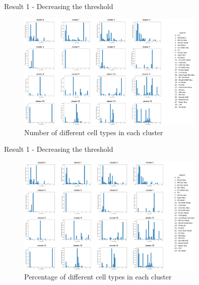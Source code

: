 \documentclass{beamer}
\begin{document}
\begin{frame}{Result 1 - Decreasing the threshold}

\begin{figure}
    \centering
    \includegraphics[width=0.8\textwidth]{type_num_clusters3.png}
    \caption{Number of different cell types in each cluster}
\end{figure} 

\end{frame}
\begin{frame}{Result 1 - Decreasing the threshold}

\begin{figure}
    \centering
    \includegraphics[width=0.8\textwidth]{type_p_clusters3.png}
    \caption{Percentage of different cell types in each cluster}
\end{figure} 

\end{frame}
\end{document}

